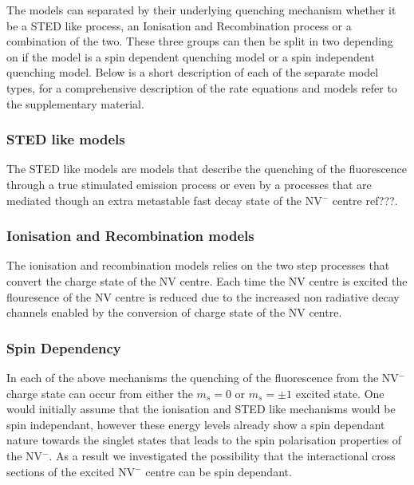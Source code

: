 \documentclass[,prl,twocolumn]{revtex4}
\begin{document}
The models can separated by their underlying quenching mechanism whether it be a STED like process, an Ionisation and Recombination process or a combination of the two. These three groups can then be split in two depending on if the model is a spin dependent quenching model or a spin independent quenching model. Below is a short description of each of the separate model types, for a comprehensive description of the rate equations and models refer to the supplementary material.

\subsubsection{STED like models}
The STED like models are models that describe the quenching of the fluorescence through a true stimulated emission process or even by a  processes that are mediated though an extra metastable fast decay state of the NV$^-$ centre ref???.

\subsubsection{Ionisation and Recombination models}
The ionisation and recombination models relies on the two step processes that convert the charge state of the NV centre. Each time the NV centre is excited the flouresence of the NV centre is reduced due to the increased non radiative decay channels enabled by the conversion of charge state of the NV centre.

\subsubsection{Spin Dependency}
In each of the above mechanisms the quenching of the fluorescence from the NV$^-$ charge state can occur from either the $m_s=0$ or $m_s=\pm1$ excited state. One would initially assume that the ionisation and STED like mechanisms would be spin independant, however these energy levels already show a spin dependant nature towards the singlet states that leads to the spin polarisation properties of the NV$^-$. As a result we investigated the possibility that the interactional cross sections of the excited NV$^-$ centre can be spin dependant.

\end{document}
